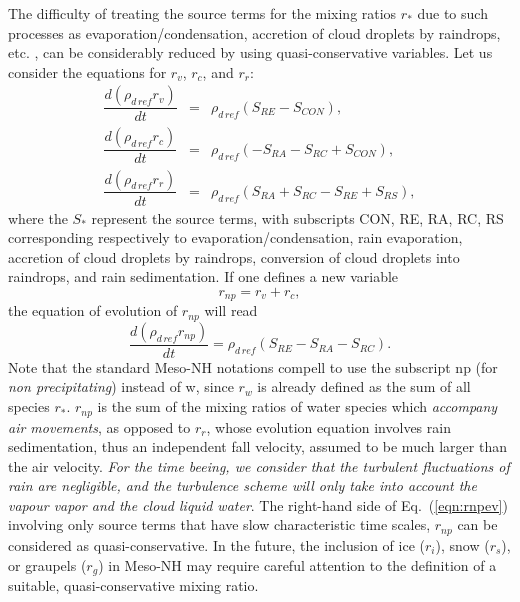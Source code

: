 The difficulty of treating the source terms for the mixing
ratios $r_*$ due to such processes as evaporation/condensation, accretion
of cloud droplets by raindrops, etc.  , can be considerably reduced by using
quasi-conservative variables.  Let us consider
the equations for $r_v$, $r_c$, and $r_r$:
\begin{eqnarray}
\dfrac{d(\rho_{d\,ref} r_v)}{dt}&=&\rho_{d\,ref}(S_{RE}-S_{CON}), \\
\dfrac{d(\rho_{d\,ref} r_c)}{dt}&=&\rho_{d\,ref}(-S_{RA}-S_{RC}+S_{CON}),\\
\dfrac{d(\rho_{d\,ref} r_r)}{dt}&=&\rho_{d\,ref}
 (S_{RA}+S_{RC}-S_{RE}+S_{RS}),
\end{eqnarray}
where the $S_*$ represent the source terms, with subscripts CON, RE, RA, RC, RS
corresponding respectively to evaporation/condensation, rain evaporation,
accretion of cloud droplets by raindrops, conversion of cloud droplets into
raindrops, and rain sedimentation.
If one defines a new variable
\begin{equation} \label{defrnp}
r_{np} = r_v+r_c,
\end{equation}
the equation of evolution of $r_{np}$ will read
\begin{equation}\label{eqn:rnpev}
\dfrac{d(\rho_{d\,ref} r_{np})}{dt} = \rho_{d\,ref} (S_{RE}-S_{RA}-S_{RC}).
\end{equation}
Note that the standard Meso-NH notations compell to use the subscript
np (for {\it non precipitating}) instead of w, since $r_w$ is already defined
as the sum of all species $r_*$.
$r_{np}$ is the sum of the mixing ratios of water species which {\it accompany
air movements}, as opposed to $r_r$, whose evolution equation involves rain
sedimentation, thus an independent fall velocity, assumed to be much larger
than the air velocity. {\it For the time beeing, we
consider that the turbulent fluctuations of rain are
negligible, and the turbulence scheme will only take into account
the vapour vapor and the cloud liquid water}.
The right-hand side of Eq.~(\ref{eqn:rnpev}) involving only source terms that
have slow characteristic time scales, $r_{np}$ can be considered as
quasi-conservative.  In the future,
the inclusion of ice ($r_i$), snow ($r_s$), or graupels ($r_g$) in Meso-NH
may require careful
attention to the definition of a suitable, quasi-conservative mixing ratio.

